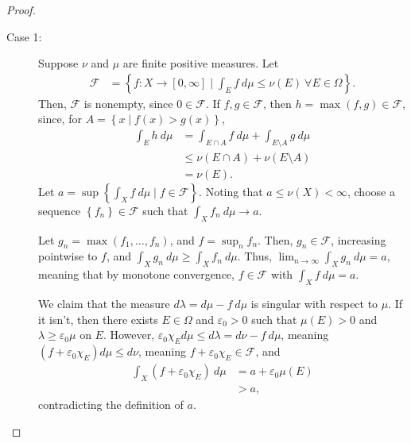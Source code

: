 \documentclass[10pt]{extarticle}
\newcommand{\set}[1]{\left\{#1\right\}}
\newcommand{\ve}{\varepsilon}
\theoremstyle{plain}
\theoremstyle{definition}
\theoremstyle{note}
\renewcommand{\newline}{\hfill\break}
\begin{document}
\begin{proof}\hfill
  \begin{description}
    \item[Case 1:] Suppose $\nu$ and $\mu$ are finite positive measures. Let
      \begin{align*}
        \mathcal{F} &= \set{f: X\rightarrow[0,\infty]\mid \int_{E}^{} f\:d\mu \leq \nu(E)~\forall E\in \Omega}.
      \end{align*}
      Then, $\mathcal{F}$ is nonempty, since $0\in \mathcal{F}$. If $f,g\in \mathcal{F}$, then $h = \max\left(f,g\right) \in \mathcal{F}$, since, for $A = \set{x\mid f(x) > g(x)}$,
      \begin{align*}
        \int_{E}^{} h\:d\mu &= \int_{E\cap A}^{} f\:d\mu + \int_{E\setminus A}^{} g\:d\mu\\
                            &\leq \nu\left(E\cap A\right) + \nu\left(E\setminus A\right)\\
                            &= \nu\left(E\right).
      \end{align*}
      Let $a = \sup\set{\int_{X}^{} f\:d\mu\mid f\in \mathcal{F}}$. Noting that $a\leq \nu(X) < \infty$, choose a sequence $\set{f_n}\in \mathcal{F}$ such that $\int_{X}f_n\:d\mu \rightarrow a$.\newline

      Let $g_n = \max\left(f_1,\dots,f_n\right)$, and $f = \sup_{n}f_n$. Then, $g_n \in \mathcal{F}$, increasing pointwise to $f$, and $\int_{X}^{} g_n\:d\mu \geq \int_{X}^{} f_n\:d\mu$. Thus, $\lim_{n\rightarrow\infty}\int_{X}^{} g_n\:d\mu = a$, meaning that by monotone convergence, $f\in \mathcal{F}$ with $\int_{X}^{} f\:d\mu = a$.\newline

      We claim that the measure $d\lambda = d\mu - f\:d\mu$ is singular with respect to $\mu$. If it isn't, then there exists $E\in \Omega$ and $\ve_0 > 0$ such that $\mu\left(E\right) > 0$ and $\lambda \geq \ve_0 \mu$ on $E$. However, $\ve_0 \chi_{E}d\mu \leq d\lambda = d\nu - f\:d\mu$, meaning $\left(f + \ve_0\chi_{E}\right)d\mu \leq d\nu$, meaning $f + \ve_0\chi_E\in \mathcal{F}$, and
      \begin{align*}
        \int_{X}^{} \left(f + \ve_0 \chi_E\right)\:d\mu &= a + \ve_0\mu(E)\\
                                                        &> a,
      \end{align*}
      contradicting the definition of $a$.\newline


\end{description}
\end{proof}
\end{document}
